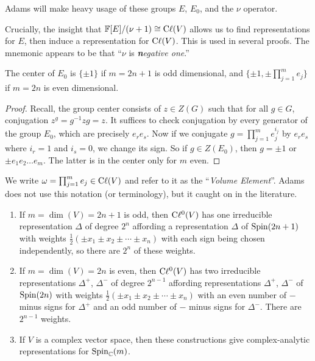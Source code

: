\begin{remark}
Adams will make heavy usage of these groups $E$, $E_{0}$, and the $\nu$ operator.
\end{remark}

\begin{remark}
Crucially, the insight that $\mathbb{F}[E]/(\nu+1)\cong\mathrm{C}\ell(V)$ allows us to find
representations for $E$, then induce a representation for $\mathrm{C}\ell(V)$. This
is used in several proofs. The mnemonic appears to be that ``$\nu$ is
\emph{\textbf{n}egative one}.''
\end{remark}

\begin{lemma}
The center of $E_{0}$ is $\{\pm1\}$ if $m=2n+1$ is odd dimensional, and
$\{\pm1,\pm\prod^{m}_{j=1}e_{j}\}$ if $m=2n$ is even dimensional.
\end{lemma}

\begin{proof}
Recall, the group center consists of $z\in Z(G)$ such that for all $g\in G$,
conjugation $z^{g}=g^{-1}zg=z$. It suffices to check conjugation by
every generator of the group $E_{0}$, which are precisely $e_{r}e_{s}$. Now if we conjugate
$g=\prod^{m}_{j=1}e_{j}^{i_{j}}$ by $e_{r}e_{s}$ where $i_{r}=1$ and $i_{s}=0$,
we change its sign. So if $g\in Z(E_{0})$, then $g=\pm1$ or $\pm e_{1}e_{2}\dots e_{m}$.
The latter is in the center only for $m$ even.
\end{proof}

We write $\omega=\prod^{m}_{j=1}e_{j}\in\mathrm{C}\ell(V)$ and refer to it as the
``\emph{Volume Element}''. Adams does not use this notation (or
terminology), but it caught on in the literature.

\begin{proposition}
\begin{enumerate}
\item If $m=\dim(V)=2n+1$ is odd, then $\mathrm{C}\ell^{0}(V)$ has one irreducible
  representation $\Delta$ of degree $2^{n}$ affording a representation
  $\Delta$ of $\operatorname{Spin}(2n+1)$ with weights $\frac{1}{2}(\pm x_{1}\pm x_{2}\pm\cdots\pm x_{n})$
  with each sign being chosen independently, so there are $2^{n}$ of
  these weights.
\item If $m=\dim(V)=2n$ is even, then $\mathrm{C}\ell^{0}(V)$ has two irreducible
  representations $\Delta^{+}$, $\Delta^{-}$ of degree $2^{n-1}$
  affording representations $\Delta^{+}$, $\Delta^{-}$ of $\operatorname{Spin}(2n)$
  with weights $\frac{1}{2}(\pm x_{1}\pm x_{2}\pm\cdots\pm x_{n})$
  with an even number of $-$ minus signs for $\Delta^{+}$ and an odd number of
  $-$ minus signs for $\Delta^{-}$. There are $2^{n-1}$ weights.
\item If $V$ is a complex vector space, then these constructions give
  complex-analytic representations for $\operatorname{Spin}_{\mathbb{C}}(m)$.
\end{enumerate}
\end{proposition}

